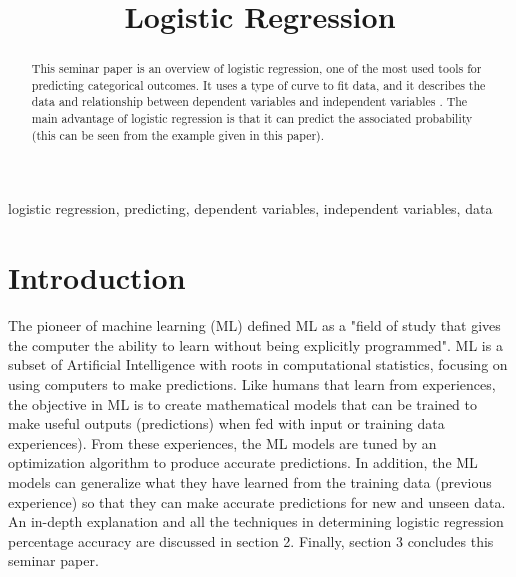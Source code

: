 \documentclass[conference]{IEEEtran}
\begin{document}
\title{Logistic Regression\\
}

\author{
}

\maketitle

\begin{abstract}
This seminar paper is an overview of logistic regression, one of the most used tools for predicting categorical outcomes. 
It uses a type of curve to fit data, and it describes the data and relationship between dependent variables and independent variables \cite{ab2}.
The main advantage of logistic regression is that it can predict the associated probability (this can be seen from the example given in this paper).
\end{abstract}

\begin{IEEEkeywords}
logistic regression, predicting, dependent variables, independent variables, data
\end{IEEEkeywords}

\section{Introduction}
The pioneer of machine learning (ML) defined ML as a "field of study that gives the computer the ability to learn without being explicitly programmed"\cite{bb1}. ML is a subset of Artificial Intelligence with roots in computational statistics, focusing on using computers to make predictions. Like humans that learn from experiences, the objective in ML is to create mathematical models that can be trained to make useful outputs (predictions) when fed with input or training data experiences). From these experiences, the ML models are tuned by an optimization
algorithm to produce accurate predictions. In addition, the ML models can generalize what they have learned from the training data (previous experience) so that they can make accurate predictions for new and unseen data\cite{bb2}.
An in-depth explanation and all the techniques in determining logistic regression percentage accuracy are discussed in section 2. Finally, section 3 concludes this seminar paper. 
\end{document}

